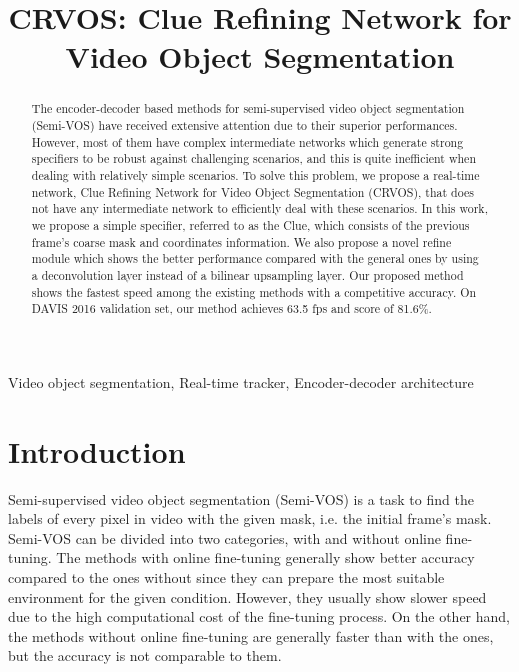 \documentclass{article}
\title{CRVOS: Clue Refining Network for Video Object Segmentation}
\begin{document}
\maketitle
\begin{abstract}

The encoder-decoder based methods for semi-supervised video object segmentation (Semi-VOS) have received extensive attention due to their superior performances. However, most of them have complex intermediate networks which generate strong specifiers to be robust against challenging scenarios, and this is quite inefficient when dealing with relatively simple scenarios. To solve this problem, we propose a real-time network, Clue Refining Network for Video Object Segmentation (CRVOS), that does not have any intermediate network to efficiently deal with these scenarios. In this work, we propose a simple specifier, referred to as the Clue, which consists of the previous frame’s coarse mask and coordinates information. We also propose a novel refine module which shows the better performance compared with the general ones by using a deconvolution layer instead of a bilinear upsampling layer. Our proposed method shows the fastest speed among the existing methods with a competitive accuracy. On DAVIS 2016 validation set, our method achieves 63.5 fps and  score of 81.6\%. 

\end{abstract}
\begin{keywords}
Video object segmentation, Real-time tracker, Encoder-decoder architecture
\end{keywords}




\section{Introduction}
\label{intro}
Semi-supervised video object segmentation (Semi-VOS) is a task to find the labels of every pixel in video with the given mask, i.e. the initial frame's mask. Semi-VOS can be divided into two categories, with and without online fine-tuning. The methods with online fine-tuning \cite{caelles2017one, voigtlaender2017online, perazzi2017learning, hu2017maskrnn} generally show better accuracy compared to the ones without since they can prepare the most suitable environment for the given condition. However, they usually show slower speed due to the high computational cost of the fine-tuning process. On the other hand, the methods without online fine-tuning \cite{marki2016bilateral, jampani2017video, cheng2018fast, yang2018efficient} are generally faster than with the ones, but the accuracy is not comparable to them.
\end{document}
